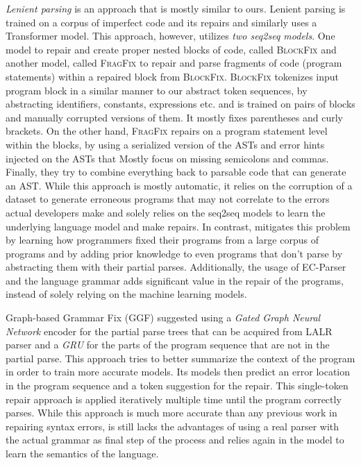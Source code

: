 \emph{Lenient parsing} \citep{Ahmed_2021} is an approach that is mostly similar
to ours. Lenient parsing is trained on a corpus of imperfect code and its
repairs and similarly uses a Transformer model. This approach, however, utilizes
\emph{two seq2seq models}. One model to repair and create proper nested blocks
of code, called \textsc{BlockFix} and another model, called \textsc{FragFix} to
repair and parse fragments of code (\eg program statements) within a repaired
block from \textsc{BlockFix}. \textsc{BlockFix} tokenizes input program block in
a similar manner to our abstract token sequences, by abstracting identifiers,
constants, expressions etc. and is trained on pairs of blocks and manually
corrupted versions of them. It mostly fixes parentheses and curly brackets. On
the other hand, \textsc{FragFix} repairs on a program statement level within the
blocks, by using a serialized version of the ASTs and error hints injected on
the ASTs that Mostly focus on missing semicolons and commas. Finally, they try
to combine everything back to parsable code that can generate an AST. While this
approach is mostly automatic, it relies on the corruption of a dataset to
generate erroneous programs that may not correlate to the errors actual
developers make and solely relies on the seq2seq models to learn the underlying
language model and make repairs. In contrast, \toolname mitigates this problem
by learning how programmers fixed their programs from a large corpus of programs
and by adding prior knowledge to even programs that don't parse by abstracting
them with their partial parses. Additionally, the usage of EC-Parser and the
language grammar adds significant value in the repair of the programs, instead
of solely relying on the machine learning models.

%
Graph-based Grammar Fix (\textsc{GGF}) \citep{Wu2020} suggested using a
\emph{Gated Graph Neural Network} encoder for the partial parse trees that can
be acquired from LALR parser and a \emph{GRU} for the parts of the program
sequence that are not in the partial parse. This approach tries to better
summarize the context of the program in order to train more accurate models. Its
models then predict an error location in the program sequence and a token
suggestion for the repair. This single-token repair approach is applied
iteratively multiple time until the program correctly parses. While this
approach is much more accurate than any previous work in repairing syntax
errors, \toolname is still lacks the advantages of using a real parser with the
actual grammar as final step of the process and relies again in the model to
learn the semantics of the language.

